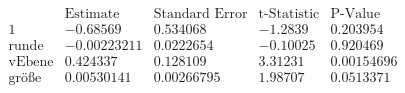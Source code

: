 \[\begin{array}{l|llll}
 \text{} & \text{Estimate} & \text{Standard Error} & \text{t-Statistic} & \text{P-Value} \\
\hline
 1 & -0.68569 & 0.534068 & -1.2839 & 0.203954 \\
 \text{runde} & -0.00223211 & 0.0222654 & -0.10025 & 0.920469 \\
 \text{vEbene} & 0.424337 & 0.128109 & 3.31231 & 0.00154696 \\
 \text{gr{\" o}{\ss}e} & 0.00530141 & 0.00266795 & 1.98707 & 0.0513371 \\
\end{array}\]

